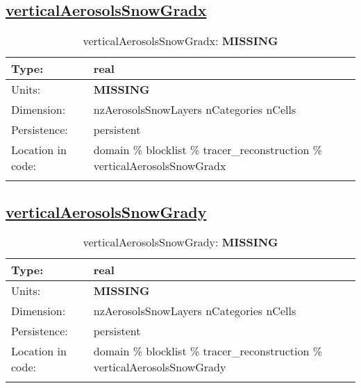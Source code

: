 \subsection[verticalAerosolsSnowGradx]{\hyperref[sec:var_tab_tracer_reconstruction]{verticalAerosolsSnowGradx}}
\label{subsec:var_sec_tracer_reconstruction_verticalAerosolsSnowGradx}
\begin{center}
\begin{longtable}{| p{2.0in} | p{4.0in} |}
        \hline 
        Type: & real \\
        \hline 
        Units: & {\bf \color{red} MISSING} \\
        \hline 
        Dimension: & nzAerosolsSnowLayers nCategories nCells \\
        \hline 
        Persistence: & persistent \\
        \hline 
         Location in code: & domain \% blocklist \% tracer\_reconstruction \% verticalAerosolsSnowGradx \\
         \hline 
    \caption{verticalAerosolsSnowGradx: {\bf \color{red} MISSING}}
\end{longtable}
\end{center}
\subsection[verticalAerosolsSnowGrady]{\hyperref[sec:var_tab_tracer_reconstruction]{verticalAerosolsSnowGrady}}
\label{subsec:var_sec_tracer_reconstruction_verticalAerosolsSnowGrady}
\begin{center}
\begin{longtable}{| p{2.0in} | p{4.0in} |}
        \hline 
        Type: & real \\
        \hline 
        Units: & {\bf \color{red} MISSING} \\
        \hline 
        Dimension: & nzAerosolsSnowLayers nCategories nCells \\
        \hline 
        Persistence: & persistent \\
        \hline 
         Location in code: & domain \% blocklist \% tracer\_reconstruction \% verticalAerosolsSnowGrady \\
         \hline 
    \caption{verticalAerosolsSnowGrady: {\bf \color{red} MISSING}}
\end{longtable}
\end{center}
